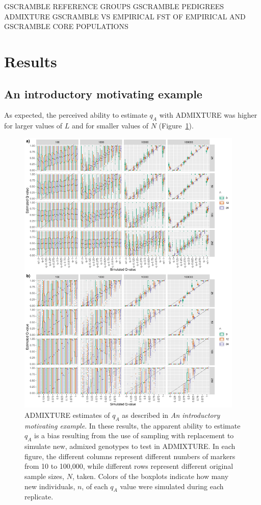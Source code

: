 GSCRAMBLE REFERENCE GROUPS
GSCRAMBLE PEDIGREES
ADMIXTURE GSCRAMBLE VS EMPIRICAL
FST OF EMPIRICAL AND GSCRAMBLE CORE POPULATIONS






\section*{Results}

\subsection*{An introductory motivating example}

As expected, the perceived ability to estimate $q_A$ with ADMIXTURE was higher
for larger values of $L$ and for smaller values of $N$ (Figure~\ref{fig:bias-sims}).
\begin{figure}
\newcommand{\biassimscap}{\footnotesize ADMIXTURE estimates of $q_A$ as described in
{\em An introductory motivating example}. In these results, the apparent ability to estimate $q_A$
is a bias resulting from the use of sampling with replacement to simulate new, admixed genotypes to
test in ADMIXTURE.  In each figure, the different columns represent different numbers of markers
from 10 to 100,000, while different rows represent different original sample sizes, $N$, taken. Colors
of the boxplots indicate how many new individuals, $n$, of each $q_A$ value were simulated during each
replicate.}
\includegraphics[width=0.96\textwidth]{figures/bias-sims-unsup-and-sup.pdf}
\caption[\biassimscap]{\biassimscap}
\label{fig:bias-sims}
\end{figure}
